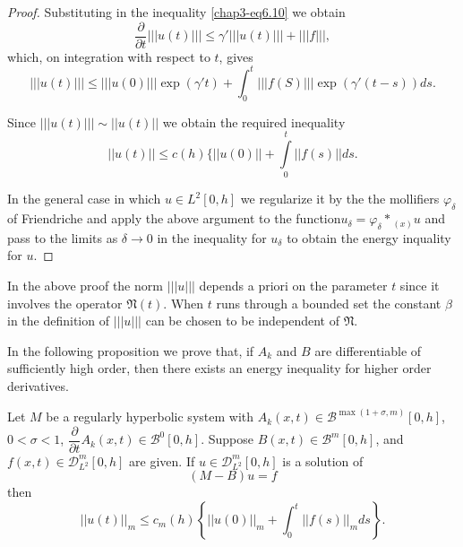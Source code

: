 \begin{proof}
Substituting in the inequality \eqref{chap3-eq6.10} we obtain 
$$
\frac{\partial}{\partial t}||| u (t)||| \leq \gamma' ||| u (t)||| +
||| f |||, 
$$
which, on integration with respect to $t$, gives
$$
||| u (t) ||| \leq ||| u (0) ||| \exp (\gamma' t) + \int^{t}_{0} ||| f
(S) ||| \exp (\gamma'(t-s)) ds. 
$$ 

Since $||| u (t) ||| \sim || u(t)|| $ we obtain the required
inequality 
 $$
|| u (t)|| \leq c(h) \{|| u(0)|| + \int\limits^{t}_{0}|| f (s) || ds.
$$

In the general case in which $u \in L^{2}[0, h]$ we
regularize it by the the mollifiers $\varphi_\delta$ of Friendriche
and apply the above argument to the function\pageoriginale $u_\delta =
\varphi_\delta * {}_{(x)}u$ and pass to the limits as $\delta \to 0$ in
the inequality for $u_\delta$ to obtain the energy inquality for $u$. 
\end{proof}

\begin{remark*}%
In the above proof the norm $||| u |||$ depends a priori on the
parameter $t$ since it involves the operator $\mathfrak{N}(t)$. When
$t$ runs through a bounded set the constant $\beta$ in the
definition of $||| u |||$ can be chosen to be independent of
$\mathfrak{N}$.  
\end{remark*}

In the following proposition we prove that, if $A_k$ and $B$ are
differentiable of sufficiently high order, then there exists an energy
inequality for higher order derivatives. 

\begin{proposition}\label{chap3-sec6-prop3}%
Let $M$ be a regularly hyperbolic system with  
$A _k (x, t)\in \mathscr{B}^{\max (1 + \sigma, m)}[0, h]$, $0 <
\sigma < 1$, $\dfrac{\partial}{\partial t} A_k(x, t) \in
\mathscr{B}^{0}[0, h]$. 
Suppose $B(x, t)\in \mathscr{B}^{m}[0, h]$, and $f(x, t)\in
\mathscr{D}^{m}_{L^{2}}[0, h]$ are given. If $u \in
\mathscr{D}^{m}_{L^{2}}[0, h]$ is a solution of 
$$
(M-B) u = f
$$
then 
\begin{equation*}
|| u (t) ||_m \leq c_{m}(h) \left\{ || u(0)||_m  + \int^{t}_{0} ||
f(s)||_m ds\right\}.  \tag{6.11}\label{chap3-eq6.11}
\end{equation*}
\end{proposition}

